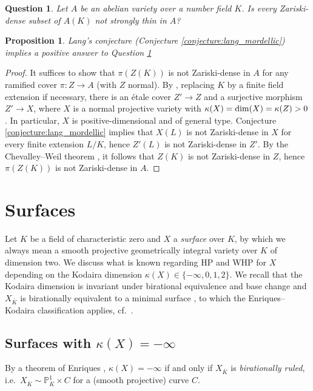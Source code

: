 \documentclass[10pt,a4paper]{amsart}
\theoremstyle{plain}
\newtheorem{proposition}[theorem]{Proposition}
\newtheorem{question}[theorem]{Question}
\theoremstyle{remark}
\numberwithin{theorem}{section}
\begin{document}
\begin{question}\label{q:abelian_dense_strongly_thin}
Let $A$ be an abelian variety over a number field $K$.
Is every Zariski-dense subset of $A(K)$ not strongly thin in $A$?
\end{question}

\begin{proposition}
Lang's conjecture (Conjecture \ref{conjecture:lang_mordellic})
implies a positive answer to Question \ref{q:abelian_dense_strongly_thin}
\end{proposition}

\begin{proof}  
It suffices to show that $\pi(Z(K))$ is not Zariski-dense in $A$
for any ramified cover $\pi\colon Z\to A$ (with $Z$ normal). 
By \cite[Theorem~26~and~Theorem~27]{Kawamata}, replacing $K$ by a finite field extension if necessary, there is an \'etale cover $Z'\to Z$ and a surjective morphism $Z'\to X$, where $X$ is a normal projective variety 
with $\kappa(X)={\rm dim}(X)=\kappa(Z)>0$.
In particular, $X$ is positive-dimensional and of general type. 
Conjecture \ref{conjecture:lang_mordellic} implies that 
$X(L)$ is not Zariski-dense in $X$ for every finite extension $L/K$,
hence $Z'(L)$ is not Zariski-dense in $Z'$.
By the Chevalley--Weil theorem \cite[Theorem~3.8]{CDJLZ}, it follows that $Z(K)$ is not Zariski-dense in $Z$, hence $\pi(Z(K))$ is not Zariski-dense in $A$. 
\end{proof}


\section{Surfaces}   
\label{sec:surfaces}

\noindent
Let $K$ be a field of characteristic zero
and $X$ a {\em surface} over $K$, by which we always mean
a smooth projective geometrically integral variety over $K$ of dimension two.
We discuss what is known regarding HP and WHP for $X$
depending on the Kodaira dimension $\kappa(X)\in\{-\infty,0,1,2\}$.
We recall that 
the Kodaira dimension is invariant
under birational equivalence and base change \cite[Proposition 9.1.2]{Poonen}
and
$X_{\overline{K}}$ is birationally equivalent to a minimal surface \cite[Theorem~6.3]{Badescu},
to which the Enriques--Kodaira classification applies,
cf.~\cite{Badescu, Beauville, Liedtke}.
 
\subsection{Surfaces with $\kappa(X)=-\infty$}
\label{sec:kappaminusinfty}
   By a theorem of Enriques \cite[Theorem~13.2]{Badescu},  
  $\kappa(X)=-\infty$ if and only if $X_{\overline{K}}$ is {\em birationally ruled},
i.e.~$X_{\overline{K}}\sim\mathbb{P}^1_{\overline{K}}\times C$ 
for a (smooth projective) curve $C$.  
  
\end{document}
